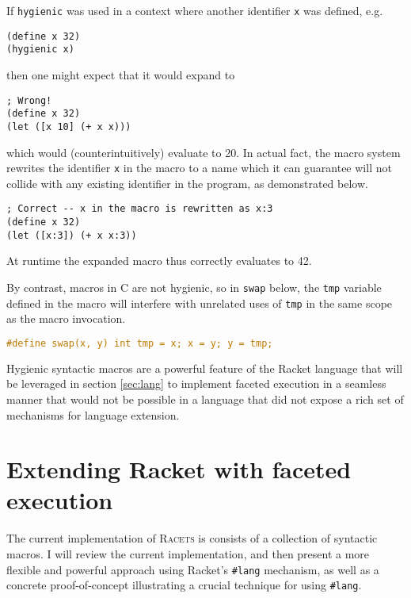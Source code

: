 \documentclass{article}
\begin{document}
If \texttt{hygienic} was used in a context where another identifier \texttt{x} was defined, e.g.

\begin{lstlisting}
(define x 32)
(hygienic x)
\end{lstlisting}

then one might expect that it would expand to

\begin{lstlisting}
; Wrong!
(define x 32)
(let ([x 10] (+ x x)))
\end{lstlisting}

which would (counterintuitively) evaluate to 20. In actual fact, the macro system rewrites the identifier \texttt{x} in the macro to a name which it can guarantee will not collide with any existing identifier in the program, as demonstrated below.

\begin{lstlisting}
; Correct -- x in the macro is rewritten as x:3
(define x 32)
(let ([x:3]) (+ x x:3))
\end{lstlisting}

At runtime the expanded macro thus correctly evaluates to 42.

By contrast, macros in C are not hygienic, so in \texttt{swap} below, the \texttt{tmp} variable defined in the macro will interfere with unrelated uses of \texttt{tmp} in the same scope as the macro invocation.

\begin{lstlisting}[language=C]
#define swap(x, y) int tmp = x; x = y; y = tmp;
\end{lstlisting}

Hygienic syntactic macros are a powerful feature of the Racket language that will be leveraged in section \ref{sec:lang} to implement faceted execution in a seamless manner that would not be possible in a language that did not expose a rich set of mechanisms for language extension.



\section{Extending Racket with faceted execution\label{sec:lang}}
The current implementation of \textsc{Racets} is consists of a collection of syntactic macros. I will review the current implementation, and then present a more flexible and powerful approach using Racket's \texttt{\#lang} mechanism, as well as a concrete proof-of-concept illustrating a crucial technique for using \texttt{\#lang}.
\end{document}
